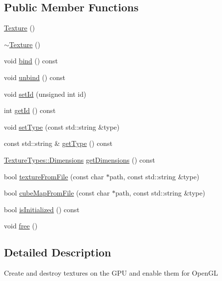 \subsection*{Public Member Functions}
\begin{DoxyCompactItemize}
\item 
\mbox{\hyperlink{classec_1_1_texture_ac2551ef676d0c771f35dc470b8a0b237}{Texture}} ()
\item 
\mbox{\hyperlink{classec_1_1_texture_ae567d80654dd09c6b02a38ca8de29ead}{$\sim$\+Texture}} ()
\item 
void \mbox{\hyperlink{classec_1_1_texture_a9e2f0191cfcc85c87edb821508cc06ee}{bind}} () const
\item 
void \mbox{\hyperlink{classec_1_1_texture_a95c72abc5c801df231fc970c6adffdcc}{unbind}} () const
\item 
void \mbox{\hyperlink{classec_1_1_texture_af3555f8dda9a13babcb96d40d4417813}{set\+Id}} (unsigned int id)
\item 
int \mbox{\hyperlink{classec_1_1_texture_a0097b0b1826d7339ae109a187b6304d5}{get\+Id}} () const
\item 
void \mbox{\hyperlink{classec_1_1_texture_a4d984f43478753facd81186d1cd36bcb}{set\+Type}} (const std\+::string \&type)
\item 
const std\+::string \& \mbox{\hyperlink{classec_1_1_texture_a1c33bc610c0b5c7807fa92897320349f}{get\+Type}} () const
\item 
\mbox{\hyperlink{structec_1_1_texture_types_ac0e07f24452fa28dd8e6e33a224842fc}{Texture\+Types\+::\+Dimensions}} \mbox{\hyperlink{classec_1_1_texture_a5d1e6d8dd6c98ea036caf2696e47637a}{get\+Dimensions}} () const
\item 
bool \mbox{\hyperlink{classec_1_1_texture_ac2461a696b914d1b22192a87d326f480}{texture\+From\+File}} (const char $\ast$path, const std\+::string \&type)
\item 
bool \mbox{\hyperlink{classec_1_1_texture_ae84b0f18fa11275f09e4c8ea3dc89e02}{cube\+Map\+From\+File}} (const char $\ast$path, const std\+::string \&type)
\item 
bool \mbox{\hyperlink{classec_1_1_texture_ab81c62fde2f54dfbb5895a421224fcd9}{is\+Initialized}} () const
\item 
void \mbox{\hyperlink{classec_1_1_texture_a57242daae8cc1ea827848f9b7f7b7fbb}{free}} ()
\end{DoxyCompactItemize}


\subsection{Detailed Description}
Create and destroy textures on the G\+PU and enable them for Open\+GL 

